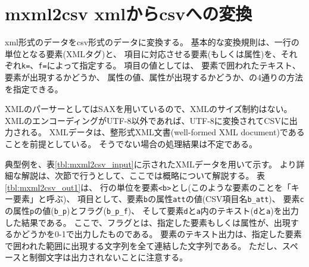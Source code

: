 
%

\section{mxml2csv xmlからcsvへの変換\label{sect:mxml2csv}}
xml形式のデータをcsv形式のデータに変換する。
基本的な変換規則は、一行の単位となる要素(XMLタグ)と、
項目に対応させる要素(もしくは属性)を、それぞれ\verb|k=|、\verb|f=|によって指定する。
項目の値としては、
要素で囲われたテキスト、要素が出現するかどうか、
属性の値、属性が出現するかどうか、の4通りの方法を指定できる。

XMLのパーサーとしてはSAXを用いているので、XMLのサイズ制約はない。
XMLのエンコーディングがUTF-8以外であれば、UTF-8に変換されてCSVに出力される。
XMLデータは、整形式XML文書(well-formed XML document)であることを前提としている。
そうでない場合の処理結果は不定である。

典型例を、表\ref{tbl:mxml2csv_input}に示されたXMLデータを用いて示す。
より詳細な解説は、次節で行うとして、ここでは概略について解説する。
表\ref{tbl:mxml2csv_out1}は、
行の単位を要素\verb|<b>|とし(このような要素のことを「キー要素」と呼ぶ)、
項目として、要素\verb|b|の属性\verb|att|の値(CSV項目名\verb|b_att|)、
要素\verb|c|の属性\verb|p|の値(\verb|b_p|)とフラグ(\verb|b_p_f|)、
そして要素\verb|d|と\verb|a|内のテキスト(\verb|d|と\verb|a|)を出力した結果である。
ここで、フラグとは、指定した要素もしくは属性が、出現するかどうかを0-1で出力したものである。
要素のテキスト出力は、指定した要素で囲われた範囲に出現する文字列を全て連結した文字列である。
ただし、スペースと制御文字は出力されないことに注意する。

